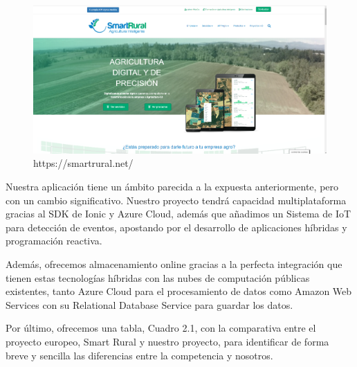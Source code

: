 \begin{figure}[H]
    \centering
    \includegraphics[width=0.85\linewidth]{images/state-art/smartrural.png}
    \caption{https://smartrural.net/}
\end{figure}

Nuestra aplicación tiene un ámbito parecida a la expuesta anteriormente, pero con un cambio significativo. Nuestro proyecto tendrá capacidad multiplataforma gracias al SDK de Ionic y Azure Cloud, además que añadimos un Sistema de IoT para detección de eventos, apostando por el desarrollo de aplicaciones híbridas y programación reactiva.

Además, ofrecemos almacenamiento online gracias a la perfecta integración que tienen estas tecnologías híbridas con las nubes de computación públicas existentes, tanto Azure Cloud para el procesamiento de datos como Amazon Web Services con su Relational Database Service para guardar los datos.

Por último, ofrecemos una tabla, Cuadro 2.1, con la comparativa entre el proyecto europeo, Smart Rural y nuestro proyecto, para identificar de forma breve y sencilla las diferencias entre la competencia y nosotros.

\begin{table}[!htbp]
    \centering
    \caption{Tabla comparativa}
\end{table}

